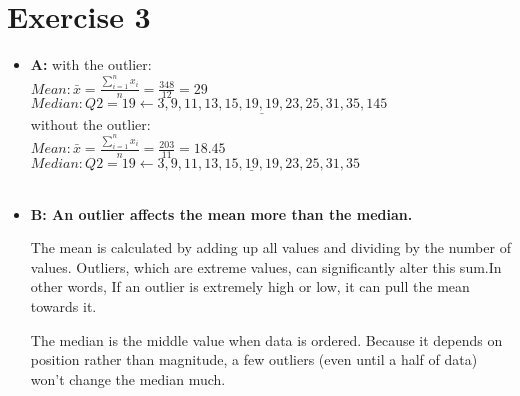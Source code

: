 \documentclass[12pt]{article}
\begin{document}
	\section{Exercise 3}
		\begin{itemize}
			\item \textbf{A:} 
				with the outlier:\\
				$Mean: \bar{x}=\frac{\sum_{i=1}^{n} x_i}{n}=\frac{348}{12}=29$\\
				$Median: Q2=19 \leftarrow 3,9,11,13,15,\underline{19,19},23,25,31,35,145$\\

				without the outlier:\\
				$Mean: \bar{x}=\frac{\sum_{i=1}^{n} x_i}{n}=\frac{203}{11}=18.45$\\
				$Median: Q2=19 \leftarrow 3,9,11,13,15,\underline{19},19,23,25,31,35$\\\\				
						
			\item \textbf{B: An outlier affects the mean more than the median.}
				
				The mean is calculated by adding up all values and dividing by the number of values. Outliers, which are extreme values, can significantly alter this sum.In other words, If an outlier is extremely high or low, it can pull the mean towards it.
				
				The median is the middle value when data is ordered. Because it depends on position rather than magnitude, a few outliers (even until a half of data) won't change the median much.
				
		\end{itemize}	
		
\end{document}
